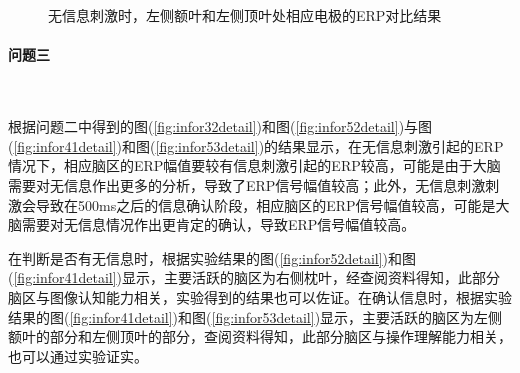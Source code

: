 \documentclass{hitreport}
\begin{document}
\begin{figure}[htb]
\centering
	\\
	\\
\caption{无信息刺激时，左侧额叶和左侧顶叶处相应电极的ERP对比结果}\label{fig:eye4153}
\end{figure}



\paragraph{问题三}~{}

根据问题二中得到的图(\ref{fig:infor32detail})和图(\ref{fig:infor52detail})与图(\ref{fig:infor41detail})和图(\ref{fig:infor53detail})的结果显示，在无信息刺激引起的ERP情况下，相应脑区的ERP幅值要较有信息刺激引起的ERP较高，可能是由于大脑需要对无信息作出更多的分析，导致了ERP信号幅值较高；此外，无信息刺激刺激会导致在500ms之后的信息确认阶段，相应脑区的ERP信号幅值较高，可能是大脑需要对无信息情况作出更肯定的确认，导致ERP信号幅值较高。

在判断是否有无信息时，根据实验结果的图(\ref{fig:infor52detail})和图(\ref{fig:infor41detail})显示，主要活跃的脑区为右侧枕叶，经查阅资料得知，此部分脑区与图像认知能力相关\cite{malenkachapter20151}，实验得到的结果也可以佐证。在确认信息时，根据实验结果的图(\ref{fig:infor41detail})和图(\ref{fig:infor53detail})显示，主要活跃的脑区为左侧额叶的部分和左侧顶叶的部分，查阅资料得知，此部分脑区与操作理解能力相关\cite{malenkachapter20151}，也可以通过实验证实。
\end{document}
